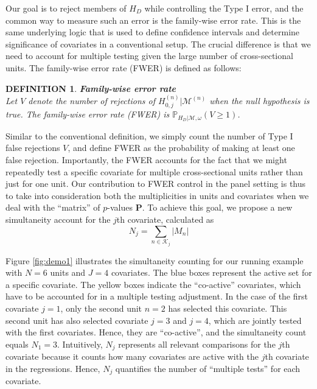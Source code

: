 \documentclass[11pt]{article}
\newcommand{\PP}{\mathbb{P}}
\newtheorem{definition}{DEFINITION}
\begin{document}



Our goal is to reject members of $H_D$ while controlling the Type I error, and the common way to measure such an error is the family-wise error rate. This is the same underlying logic that is used to define confidence intervals and determine significance of covariates in a conventional setup. The crucial difference is that we need to account for multiple testing given the large number of cross-sectional units. The family-wise error rate (FWER) is defined as follows:

\begin{definition}{\bf Family-wise error rate}\label{def6}\\
	Let $V$ denote the number of rejections of $H_{0,j}^{(n)}|\mathcal{M}^{(n)}$ when the null hypothesis is true. The family-wise error rate (FWER) is $\PP_{H_D|\mathcal{M},\omega}(V\geq 1)$.
\end{definition}

Similar to the conventional definition, we simply count the number of Type I false rejections $V$, and define FWER as the probability of making at least one false rejection. Importantly, the FWER accounts for the fact that we might repeatedly test a specific covariate for multiple cross-sectional units rather than just for one unit. Our contribution to FWER control in the panel setting is thus to take into consideration both the multiplicities in units and covariates when we deal with the ``matrix'' of $p$-values $\bm{P}$. To achieve this goal, we propose a new simultaneity account for the $j$th covariate, calculated as
\begin{equation}\label{eq28:simcount}
	N_j=\sum_{n\in \mathcal{K}_j}|M_n|
\end{equation}

Figure \ref{fig:demo1} illustrates the simultaneity counting for our running example with $N=6$ units and $J=4$ covariates. The blue boxes represent the active set for a specific covariate. The yellow boxes indicate the ``co-active'' covariates, which have to be accounted for in a multiple testing adjustment. In the case of the first covariate $j=1$, only the second unit $n=2$ has selected this covariate. This second unit has also selected covariate $j=3$ and $j=4$, which are jointly tested with the first covariates. Hence, they are ``co-active'', and the simultaneity count equals $N_1=3$. Intuitively, $N_j$ represents all relevant comparisons for the $j$th covariate because it counts how many covariates are active with the $j$th covariate in the regressions. Hence, $N_j$ quantifies the number of ``multiple tests'' for each covariate.
\end{document}
